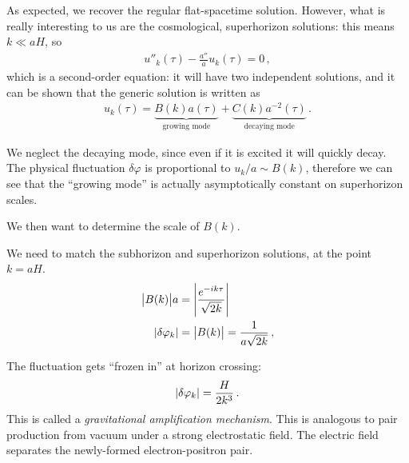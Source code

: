 \documentclass[main.tex]{subfiles}
\begin{document}
As expected, we recover the regular flat-spacetime solution.
However, what is really interesting to us are the cosmological, superhorizon solutions: this means \(k \ll a H\), so 
%
\begin{align}
u''_k (\tau ) - \frac{a''}{a} u_k (\tau ) = 0
\,,
\end{align}
%
which is a second-order equation: it will have two independent solutions, and it can be shown that the generic solution is written as 
%
\begin{align}
u_k(\tau ) = \underbrace{B(k) a(\tau )}_{\text{growing mode}} + \underbrace{C(k) a^{-2}(\tau )}_{\text{decaying mode}}
\,.
\end{align}

We neglect the decaying mode, since even if it is excited it will quickly decay.
The physical fluctuation \(\delta \varphi \) is proportional to \(u_k /a \sim B(k)\), therefore we can see that the ``growing mode'' is actually asymptotically constant on superhorizon scales. 

We then want to determine the scale of \(B(k)\). 

We need to match the subhorizon and superhorizon solutions, at the point \(k = aH\). 
%
\begin{align}
\abs{B(k)} a &= \abs{\frac{e^{-ik \tau }}{\sqrt{2 k}}}   \\
\abs{ \delta \varphi _k} &= \abs{B(k)} = \frac{1}{a \sqrt{2k}} 
\,,
\end{align}
%

The fluctuation gets ``frozen in'' at horizon crossing: 
%
\begin{align}
\abs{ \delta \varphi _k} = \frac{H}{2 k^3}
\,.
\end{align}
%
This is called a \emph{gravitational amplification mechanism}.
This is analogous to pair production from vacuum under a strong electrostatic field. The electric field separates the newly-formed electron-positron pair. 
\end{document}
